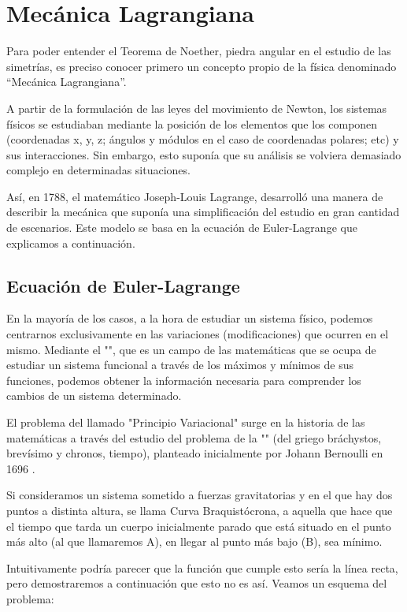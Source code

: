 \chapter{Mecánica Lagrangiana}\label{ch:mecanica-lagrangiana}
Para poder entender el Teorema de Noether, piedra angular en el estudio de las simetrías, es preciso conocer primero un concepto propio de la física denominado \textquotedblleft Mecánica Lagrangiana\textquotedblright.

A partir de la formulación de las leyes del movimiento de Newton, los sistemas físicos se estudiaban mediante la posición de los elementos que los componen (coordenadas x, y, z; ángulos y módulos en el caso de coordenadas polares; etc) y sus interacciones.
Sin embargo, esto suponía que su análisis se volviera demasiado complejo en determinadas situaciones.

Así, en 1788, el matemático Joseph-Louis Lagrange, desarrolló una manera de describir la mecánica que suponía una simplificación del estudio en gran cantidad de escenarios. Este modelo se basa en la ecuación de Euler-Lagrange que explicamos a continuación.
\section{Ecuación de Euler-Lagrange}\label{sec:ecuacion-de-euler-lagrange}
En la mayoría de los casos, a la hora de estudiar un sistema físico, podemos centrarnos exclusivamente en las variaciones (modificaciones) que ocurren en el mismo. Mediante el "", que es un campo de las matemáticas que se ocupa de estudiar un sistema funcional a través de los máximos y mínimos de sus funciones, podemos obtener la información necesaria para comprender los cambios de un sistema determinado.

El problema del llamado "Principio Variacional" surge en la historia de las matemáticas a través del estudio del problema de la "" (del griego bráchystos, brevísimo y chronos, tiempo), planteado inicialmente por Johann Bernoulli en 1696 \cite{AE}.

Si consideramos un sistema sometido a fuerzas gravitatorias y en el que hay dos puntos a distinta altura, se llama Curva Braquistócrona, a aquella que hace que el tiempo que tarda un cuerpo inicialmente parado que está situado en el punto más alto (al que llamaremos A), en llegar al punto más bajo (B), sea mínimo.

Intuitivamente podría parecer que la función que cumple esto sería la línea recta, pero demostraremos a continuación que esto no es así. Veamos un esquema del problema:


